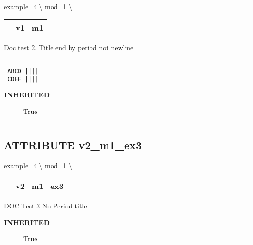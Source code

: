 \hypertarget{ecldoc:example_3.mod_1.v1_m1}{}
\hspace{0pt} \hyperlink{ecldoc:intest.in1intest.example_4}{example_4} \textbackslash 
\hspace{0pt} \hyperlink{ecldoc:intest.in1intest.example_4.mod_1}{mod_1} \textbackslash 

{\renewcommand{\arraystretch}{1.5}
\begin{tabularx}{\textwidth}{|>{\raggedright\arraybackslash}l|X|}
\hline
\hspace{0pt}\mytexttt{\color{red} } & \textbf{v1\_m1} \\
\hline
\end{tabularx}
}

\par
Doc test 2. Title end by period not newline 
\begin{verbatim}

 ABCD ||||
 CDEF ||||\end{verbatim}



\par
\begin{description}
\item [\colorbox{tagtype}{\color{white} \textbf{\textsf{INHERITED}}}] \textbf{\underline{}} True
\end{description}

\rule{\linewidth}{0.5pt}
\subsection*{\textsf{\colorbox{headtoc}{\color{white} ATTRIBUTE}
v2\_m1\_ex3}}

\hypertarget{ecldoc:example_3.mod_1.v2_m1_ex3}{}
\hspace{0pt} \hyperlink{ecldoc:intest.in1intest.example_4}{example_4} \textbackslash 
\hspace{0pt} \hyperlink{ecldoc:intest.in1intest.example_4.mod_1}{mod_1} \textbackslash 

{\renewcommand{\arraystretch}{1.5}
\begin{tabularx}{\textwidth}{|>{\raggedright\arraybackslash}l|X|}
\hline
\hspace{0pt}\mytexttt{\color{red} } & \textbf{v2\_m1\_ex3} \\
\hline
\end{tabularx}
}

\par
DOC Test 3 No Period title

\par
\begin{description}
\item [\colorbox{tagtype}{\color{white} \textbf{\textsf{INHERITED}}}] \textbf{\underline{}} True
\end{description}

